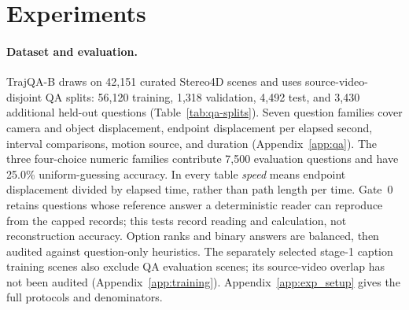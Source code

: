 \section{Experiments}
\label{sec:experiments}

\paragraph{Dataset and evaluation.}
\label{sec:qa}
TrajQA-B draws on 42,151 curated Stereo4D scenes and uses source-video-disjoint QA splits: 56,120 training, 1,318 validation, 4,492 test, and 3,430 additional held-out questions (Table~\ref{tab:qa-splits}). Seven question families cover camera and object displacement, endpoint displacement per elapsed second, interval comparisons, motion source, and duration (Appendix~\ref{app:qa}). The three four-choice numeric families contribute 7,500 evaluation questions and have 25.0\% uniform-guessing accuracy. In every table \emph{speed} means endpoint displacement divided by elapsed time, rather than path length per time. Gate~0 retains questions whose reference answer a deterministic reader can reproduce from the capped records; this tests record reading and calculation, not reconstruction accuracy. Option ranks and binary answers are balanced, then audited against question-only heuristics. The separately selected stage-1 caption training scenes also exclude QA evaluation scenes; its source-video overlap has not been audited (Appendix~\ref{app:training}). Appendix~\ref{app:exp_setup} gives the full protocols and denominators.

